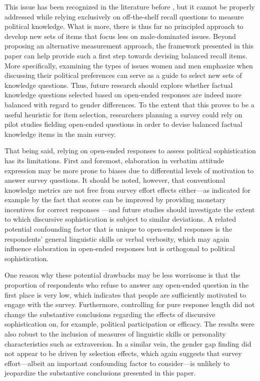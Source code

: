 This issue has been recognized in the literature before \citep[e.g.,][]{graber2001processing,dolan2011women,ferrin2020gender}, but it cannot be properly addressed while relying exclusively on off-the-shelf recall questions to measure political knowledge. What is more, there is thus far no principled approach to develop new sets of items that focus less on male-dominated issues. Beyond proposing an alternative measurement approach, the framework presented in this paper can help provide such a first step towards devising balanced recall items. More specifically, examining the types of issues women and men emphasize when discussing their political preferences can serve as a guide to select new sets of knowledge questions. Thus, future research should explore whether factual knowledge questions selected based on open-ended responses are indeed more balanced with regard to gender differences. To the extent that this proves to be a useful heuristic for item selection, researchers planning a survey could rely on pilot studies fielding open-ended questions in order to devise balanced factual knowledge items in the main survey.

That being said, relying on open-ended responses to assess political sophistication has its limitations. First and foremost, elaboration in verbatim attitude expression may be more prone to biases due to differential levels of motivation to answer survey questions. It should be noted, however, that conventional knowledge metrics are not free from survey effort effects either---as indicated for example by the fact that scores can be improved by providing monetary incentives for correct responses \citep{prior2008money}---and future studies should investigate the extent to which discursive sophistication is subject to similar deviations. A related potential confounding factor that is unique to open-ended responses is the respondents' general linguistic skills or verbal verbosity, which may again influence elaboration in open-ended responses but is orthogonal to political sophistication.

One reason why these potential drawbacks may be less worrisome is that the proportion of respondents who refuse to answer any open-ended question in the first place is very low, which indicates that people are sufficiently motivated to engage with the survey. Furthermore, controlling for pure response length did not change the substantive conclusions regarding the effects of discursive sophistication on, for example, political participation or efficacy. The results were also robust to the inclusion of measures of linguistic skills or personality characteristics such as extraversion. In a similar vein, the gender gap finding did not appear to be driven by selection effects, which again suggests that survey effort---albeit an important confounding factor to consider---is unlikely to jeopardize the substantive conclusions presented in this paper.

